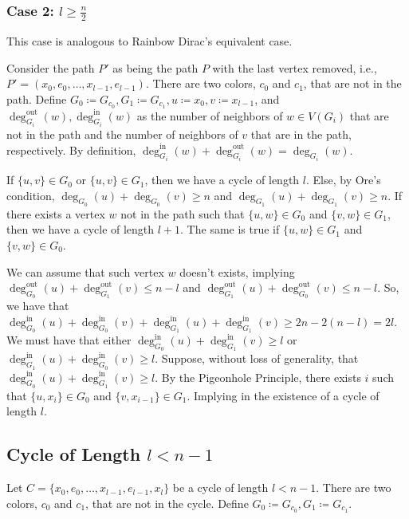 \subsubsection{Case 2: \( l \geq \frac{n}{2} \)}

This case is analogous to Rainbow Dirac's equivalent case.

Consider the path $P'$ as being the path $P$ with the last vertex removed, i.e., $P' = (x_0, e_0, \dots, x_{l-1}, e_{l-1})$.
There are two colors, $c_0$ and $c_1$, that are not in the path. Define 
\(G_0 \coloneqq G_{c_0}, G_1 \coloneqq G_{c_1}, u \coloneqq x_0, v \coloneqq x_{l-1}\), and 
\( \deg^{\text{out}}_{G_i}(w), \deg^{\text{in}}_{G_i}(w) \) as the number of neighbors of \(w \in V(G_i)\) that are not in the path
and the number of neighbors of \(v\) that are in the path, respectively.
By definition, \( \deg^{\text{in}}_{G_i}(w) +  \deg^{\text{out}}_{G_i}(w) = \deg_{G_i}(w) \).

If \( \{u, v\} \in G_0 \) or \( \{u, v\} \in G_1 \), then we have a cycle of length \( l \).
Else, by Ore's condition, \( \deg_{G_0}(u) + \deg_{G_0}(v) \geq n \) and \( \deg_{G_1}(u) + \deg_{G_1}(v) \geq n \).
If there exists a vertex \(w\) not in the path such that \( \{u, w\} \in G_0 \) and \( \{v, w\} \in G_1 \), 
then we have a cycle of length \( l + 1 \). The same is true if \( \{u, w\} \in G_1 \) and \( \{v, w\} \in G_0 \).

We can assume that such vertex \(w\) doesn't exists, implying 
\( \deg^{\text{out}}_{G_0}(u) + \deg^{\text{out}}_{G_1}(v) \leq n - l \) and
\( \deg^{\text{out}}_{G_1}(u) + \deg^{\text{out}}_{G_0}(v) \leq n - l \). 
So, we have that \( \deg^{\text{in}}_{G_0}(u) + \deg^{\text{in}}_{G_0}(v) + 
\deg^{\text{in}}_{G_1}(u) + \deg^{\text{in}}_{G_1}(v)  \geq 2 n - 2 ( n - l  ) = 2 l \). We must have that 
either \( \deg^{\text{in}}_{G_0}(u) + \deg^{\text{in}}_{G_1}(v) \geq l \) or 
\( \deg^{\text{in}}_{G_1}(u) + \deg^{\text{in}}_{G_0}(v) \geq l \).
Suppose, without loss of generality, that \( \deg^{\text{in}}_{G_0}(u) + \deg^{\text{in}}_{G_1}(v) \geq l \).
By the Pigeonhole Principle, there exists \(i\) such that 
\( \{u, x_i\} \in G_0 \) and \( \{v, x_{i-1}\} \in G_1 \).
Implying in the existence of a cycle of length \( l \).

\subsection{Cycle of Length $l < n - 1$}

Let \( C = \{x_0, e_0, \dots, x_{l-1}, e_{l-1}, x_{l}\} \) be a cycle of length \( l < n - 1 \).
There are two colors, $c_0$ and $c_1$, that are not in the cycle. Define \(G_0 \coloneqq G_{c_0}, G_1 \coloneqq G_{c_1} \).

